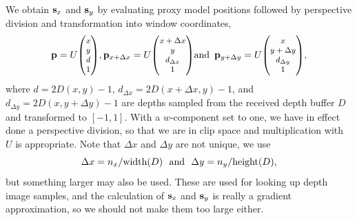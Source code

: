 %
We obtain $\mathbf{s}_{x}$ and $\mathbf{s}_{y}$ by evaluating proxy model positions followed by 
perspective division and transformation into window coordinates,
\[
  \pv =
  U { \small \begin{pmatrix} x \\ y \\ d \\ 1 \end{pmatrix} },
  \pv_{x+\Delta x} =
  U { \small \begin{pmatrix} x+\Delta x \\ y \\ d_{\Delta x} \\ 1 \end{pmatrix} }
  \text{and}\, \, \, 
  \pv_{y+\Delta y} =
  U { \small \begin{pmatrix} x \\ y+\Delta y \\ d_{\Delta y} \\ 1 \end{pmatrix} },
\]
where $d = 2D(x, y) - 1$, $d_{\Delta x} =
2D(x+\Delta x, y) - 1$, and $d_{\Delta y} = 2D(x,
y+\Delta y) - 1$ are depths sampled from the received depth buffer
$D$ and transformed to $[-1, 1]$. With a
$w$-component set to one, we have in effect done a perspective division, so that
we are in clip space and multiplication with $U$ is appropriate.
%
Note that $\Delta x$ and $\Delta y$ are not unique, we use
\[
  \Delta x = n_x / \text{width}(D) \text{\,\,\,\,and\,\,\,\,}
  \Delta y = n_y / \text{height}(D),
\]
but something larger may also be used. These are used for looking up depth image
samples, and the calculation of $\mathbf{s}_x$ and $\mathbf{s}_y$ is really a gradient
approximation, so we should not make them too large either.

